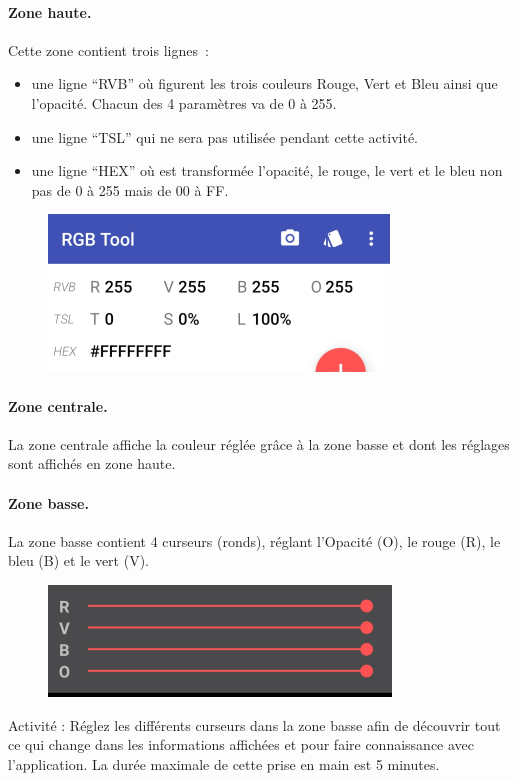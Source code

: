 \documentclass[12pt,a4paper,notitlepage]{article}
\begin{document}
\paragraph{Zone haute.}
Cette zone contient trois lignes~:
\begin{itemize}
	\item une ligne ``RVB'' où figurent les trois couleurs Rouge, Vert et Bleu ainsi que l'opacité. Chacun des 4 paramètres va de 0 à 255.
	\item une ligne ``TSL'' qui ne sera pas utilisée pendant cette activité.
	\item une ligne ``HEX'' où est transformée l'opacité, le rouge, le vert et le bleu non pas de 0 à 255 mais de 00 à FF.
\end{itemize}
\begin{figure}
	\centering
	\includegraphics{zone-haute.png}
\end{figure}

\paragraph{Zone centrale.}
La zone centrale affiche la couleur réglée grâce à la zone basse et dont les réglages sont affichés en zone haute.

\paragraph{Zone basse.}
La zone basse contient 4 curseurs (ronds), réglant l'Opacité (O), le rouge (R), le bleu (B) et le vert (V).
\begin{figure}
	\centering
	\includegraphics{zone-basse.png}
\end{figure}

\begin{bclogo}[logo=\bccrayon, couleur=yellow!5, arrondi=0.1, nobreak]{Activité :}
Réglez les différents curseurs dans la zone basse afin de découvrir tout ce qui change dans les informations affichées et pour faire connaissance avec l'application.
La durée maximale de cette prise en main est 5 minutes.
\end{bclogo}
\end{document}
